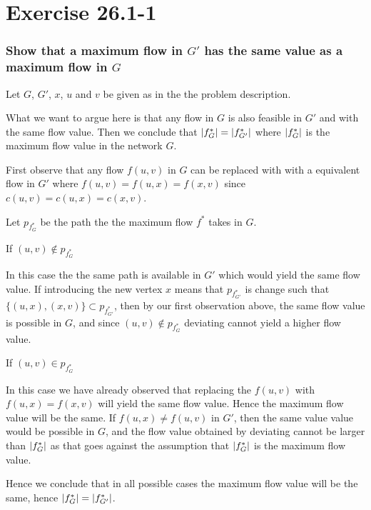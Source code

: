 \section*{Exercise 26.1-1}
\subsubsection*{Show that a maximum flow in $G'$ has the same value as a maximum flow in $G$}
Let $G$, $G'$, $x$, $u$ and $v$ be given as in the the problem description.

What we want to argue here is that any flow in $G$ is also feasible in $G'$ and with the same flow value. 
Then we conclude that $\lvert f_G^*\rvert = \lvert f_{G'}^*\rvert$ where $\lvert f_{G}^*\rvert$ is the maximum flow value in the network $G$.

First observe that any flow $f(u,v)$ in $G$ can be replaced with with a equivalent flow in $G'$ where $f(u,v) = f(u,x) = f(x,v)$ since $c(u,v) = c(u,x) = c(x,v)$.

Let $p_{f_G^*}$ be the path the the maximum flow $f^*$ takes in $G$.

\begin{description}[align=parleft]
\item If $(u,v) \not\in p_{f_G^*}$
\end{description}
In this case the the same path is available in $G'$ which would yield the same flow value. If introducing the new vertex $x$ means that $p_{f_{G'}^*}$ is change such that $\{(u,x),(x,v)\}\subset p_{f_{G'}^*}$, then by our first observation above, the same flow value is possible in $G$, and since $(u,v) \not\in p_{f_G^*}$ deviating cannot yield a higher flow value.

\begin{description}[align=parleft]
\item If $(u,v) \in p_{f_G^*}$
\end{description}
In this case we have already observed that replacing the $f(u,v)$ with $f(u,x) = f(x,v)$ will yield the same flow value. Hence the maximum flow value will be the same. If $f(u,x) \neq f(u,v)$ in $G'$, then the same value value would be possible in $G$, and the flow value obtained by deviating cannot be larger than $\lvert f^*_G\rvert$ as that goes against the assumption that $\lvert f^*_G\rvert$ is the maximum flow value.

Hence we conclude that in all possible cases the maximum flow value will be the same, hence $\lvert f_G^*\rvert = \lvert f_{G'}^*\rvert$.